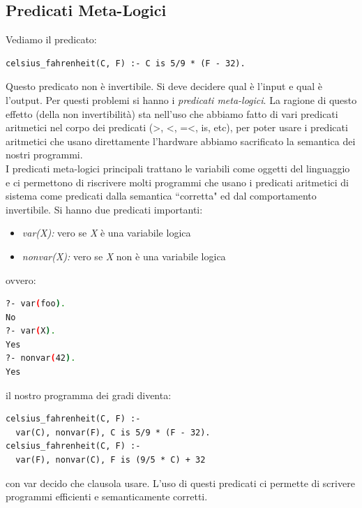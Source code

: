 \documentclass[a4paper,12pt, oneside]{book}
\begin{document}
\subsection{Predicati Meta-Logici}
Vediamo il predicato:
\begin{verbatim}
celsius_fahrenheit(C, F) :- C is 5/9 * (F - 32).
\end{verbatim}
Questo predicato non è invertibile. Si deve decidere qual è l'input e qual è l'output. Per questi problemi si hanno i \textit{predicati meta-logici}. La ragione di questo effetto (della non invertibilità) sta nell'uso che abbiamo fatto di vari predicati aritmetici nel corpo dei predicati (>, <, =<, is, etc), per poter usare i predicati aritmetici che usano direttamente l'hardware abbiamo sacrificato la semantica dei
nostri programmi.\\
I predicati meta-logici principali trattano le variabili come oggetti del linguaggio e ci permettono di riscrivere molti programmi che usano i predicati aritmetici di sistema come predicati dalla semantica “corretta" ed dal comportamento invertibile. Si hanno due predicati importanti:
\begin{itemize}
\item \textit{var(X):}  vero se \textit{X} è una variabile logica
\item \textit{nonvar(X):}  vero se \textit{X} non è una variabile logica
\end{itemize}
ovvero:

\begin{shaded}
\begin{lstlisting}[language=bash]
?- var(foo).
No
?- var(X).
Yes
?- nonvar(42).
Yes
\end{lstlisting}
\end{shaded}

il nostro programma dei gradi diventa:
\begin{verbatim}
celsius_fahrenheit(C, F) :- 
  var(C), nonvar(F), C is 5/9 * (F - 32).
celsius_fahrenheit(C, F) :- 
  var(F), nonvar(C), F is (9/5 * C) + 32
\end{verbatim}
con var decido che clausola usare. L'uso di questi predicati ci permette di scrivere programmi efficienti e semanticamente corretti.
\end{document}
